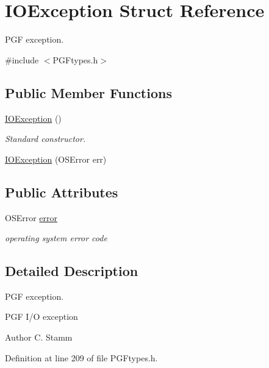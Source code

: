 \hypertarget{structIOException}{}\section{I\+O\+Exception Struct Reference}
\label{structIOException}


P\+GF exception.  




{\ttfamily \#include $<$P\+G\+Ftypes.\+h$>$}

\subsection*{Public Member Functions}
\begin{DoxyCompactItemize}
\item 
\mbox{\hyperlink{structIOException_ad1e8e7e09716ddc197a23611250fa180}{I\+O\+Exception}} ()
\begin{DoxyCompactList}\small\item\em Standard constructor. \end{DoxyCompactList}\item 
\mbox{\hyperlink{structIOException_a376ee2ee1fd67ef6de01e64ff142badb}{I\+O\+Exception}} (O\+S\+Error err)
\end{DoxyCompactItemize}
\subsection*{Public Attributes}
\begin{DoxyCompactItemize}
\item 
O\+S\+Error \mbox{\hyperlink{structIOException_a0bb5b188546419d80622e4e5ef951ec7}{error}}
\begin{DoxyCompactList}\small\item\em operating system error code \end{DoxyCompactList}\end{DoxyCompactItemize}


\subsection{Detailed Description}
P\+GF exception. 

P\+GF I/O exception \begin{DoxyAuthor}{Author}
C. Stamm 
\end{DoxyAuthor}


Definition at line 209 of file P\+G\+Ftypes.\+h.



